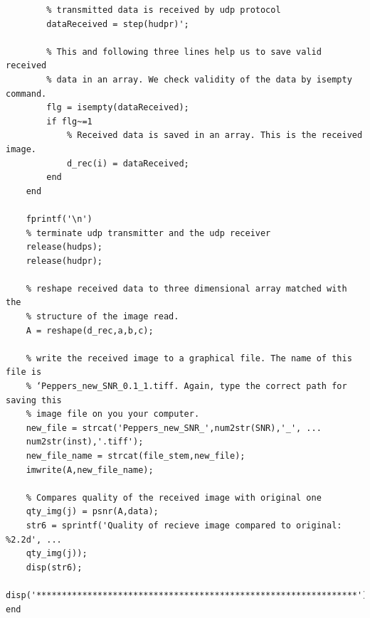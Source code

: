 \documentclass{article}
\begin{document}
\begin{lstlisting}
		% transmitted data is received by udp protocol
		dataReceived = step(hudpr)';

		% This and following three lines help us to save valid received
		% data in an array. We check validity of the data by isempty command.
		flg = isempty(dataReceived);
		if flg~=1 
			% Received data is saved in an array. This is the received image.
			d_rec(i) = dataReceived;
		end
	end

	fprintf('\n')
	% terminate udp transmitter and the udp receiver
	release(hudps);
	release(hudpr);

	% reshape received data to three dimensional array matched with the
	% structure of the image read.
	A = reshape(d_rec,a,b,c); 

	% write the received image to a graphical file. The name of this file is
	% ‘Peppers_new_SNR_0.1_1.tiff. Again, type the correct path for saving this
	% image file on you your computer.
	new_file = strcat('Peppers_new_SNR_',num2str(SNR),'_', ...
	num2str(inst),'.tiff');
	new_file_name = strcat(file_stem,new_file);
	imwrite(A,new_file_name);

	% Compares quality of the received image with original one
	qty_img(j) = psnr(A,data);
	str6 = sprintf('Quality of recieve image compared to original: %2.2d', ...
	qty_img(j));
	disp(str6);
	disp('***************************************************************')
end
\end{lstlisting}
\end{document}
